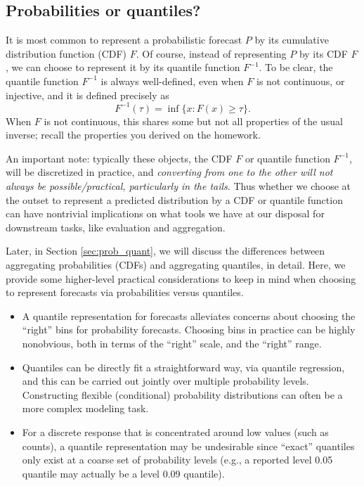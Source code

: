 \documentclass{article}
\begin{document}
\subsection{Probabilities or quantiles?}

It is most common to represent a probabilistic forecast $P$ by its cumulative
distribution function (CDF) $F$. Of course, instead of representing $P$ by its
CDF $F$, we can choose to represent it by its quantile function
$F^{-1}$. To be clear, the quantile function $F^{-1}$ is always well-defined,
even when $F$ is not continuous, or injective, and it is defined precisely as
\[
F^{-1}(\tau) = \inf\{ x : F(x) \geq \tau\}.
\]
When $F$ is not continuous, this shares some but not all properties of the 
usual inverse; recall the properties you derived on the homework.

An important note: typically these objects, the CDF $F$ or quantile function
$F^{-1}$, will be discretized in practice, and \emph{converting from one to the
  other will not always be possible/practical, particularly in the tails}. Thus
whether we choose at the outset to represent a predicted distribution by a CDF
or quantile function can have nontrivial implications on what tools we have at
our disposal for downstream tasks, like evaluation and aggregation.

Later, in Section \ref{sec:prob_quant}, we will discuss the differences between
aggregating probabilities (CDFs) and aggregating quantiles, in detail. Here, we
provide some higher-level practical considerations to keep in mind when choosing
to represent forecasts via probabilities versus quantiles.  

\begin{itemize}
\item A quantile representation for forecasts alleviates concerns about choosing
  the ``right'' bins for probability forecasts. Choosing bins in practice can be
  highly nonobvious, both in terms of the ``right''  scale, and the ``right''
  range.  

\item Quantiles can be directly fit a straightforward way, via quantile
  regression, and this can be carried out jointly over multiple probability
  levels. Constructing flexible (conditional) probability distributions can
  often be a more complex modeling task.  

\item For a discrete response that is concentrated around low values (such as 
  counts), a quantile representation may be undesirable since ``exact''
  quantiles only exist at a coarse set of probability levels (e.g., a reported
  level 0.05 quantile may actually be a level 0.09 quantile).     
\end{itemize}
\end{document}
